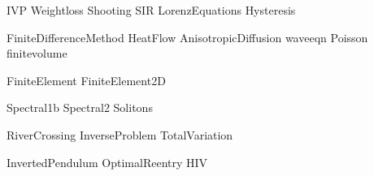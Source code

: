 \documentclass[nociteref]{SIAM-GH-book}
\begin{document}
{IVP}
{Weightloss}
{Shooting}
{SIR}
{LorenzEquations}
{Hysteresis}

{FiniteDifferenceMethod}
{HeatFlow}
{AnisotropicDiffusion}
{waveeqn}
{Poisson}
{finitevolume}


{FiniteElement}
{FiniteElement2D}

{Spectral1b}
{Spectral2}
{Solitons}

{RiverCrossing}
{InverseProblem}
{TotalVariation}

{InvertedPendulum}
{OptimalReentry}
{HIV}
\end{document}
